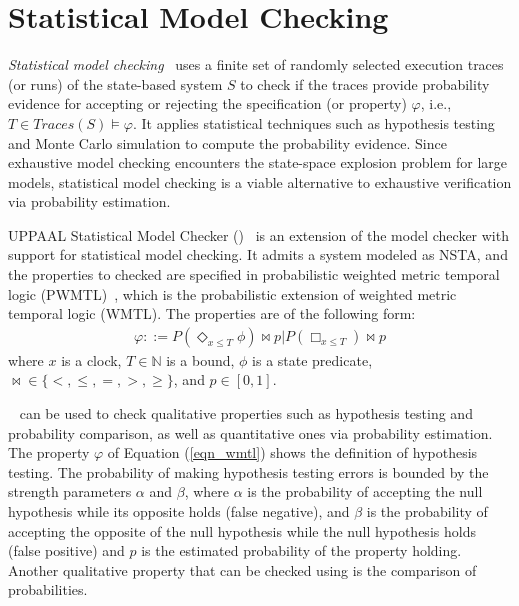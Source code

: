 \section{Statistical Model Checking}
\textit{Statistical model checking}~\cite{Agha2018AChecking} uses a finite set of randomly selected execution traces (or runs) of the state-based system $S$ to check if the traces provide probability evidence for accepting or rejecting the specification (or property) $\varphi$, i.e., $T\in Traces(S)\models \varphi$. It applies statistical techniques such as hypothesis testing and Monte Carlo simulation to compute the probability evidence. Since exhaustive model checking encounters the state-space explosion problem for large models, statistical model checking is a viable alternative to exhaustive verification via probability estimation. 

UPPAAL Statistical Model Checker (\uppaalsmc)~\cite{Bulychev2012UPPAAL-SMC:Automata} is an extension of the model checker \uppaal{} with support for statistical model checking. It admits a system modeled as NSTA, and the properties to checked are specified in probabilistic weighted metric temporal logic (PWMTL)~\cite{David2011StatisticalAutomata}, which is the probabilistic extension of weighted metric temporal logic (WMTL). The properties are of the following form: 
\begin{align}\label{eqn_wmtl}
\varphi::=P(\Diamond_{x\leq T}\phi)\bowtie p | P(\Box_{x\leq T})\bowtie p
\end{align}
where $x$ is a clock, $T\in \mathbb{N}$ is a bound, $\phi$ is a state predicate, $\bowtie \in\{<,\leq,=,>,\geq\}$, and $p \in [0, 1]$.

\uppaalsmc~\cite{David2011TimeSystems}\cite{Bulychev2012UPPAAL-SMC:Automata} can be used to check qualitative properties such as hypothesis testing and probability comparison, as well as quantitative ones via probability estimation. The property $\varphi$ of Equation (\ref{eqn_wmtl}) shows the definition of hypothesis testing. The probability of making hypothesis testing errors is bounded by the strength parameters $\alpha$ and $\beta$, where $\alpha$ is the probability of accepting the null hypothesis while its opposite holds (false negative), and $\beta$ is the probability of accepting the opposite of the null hypothesis while the null hypothesis holds (false positive) and $p$ is the estimated probability of the property holding. Another qualitative property that can be checked using \uppaalsmc{} is the comparison of probabilities.


